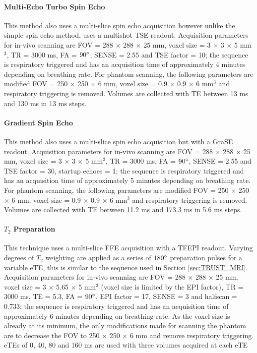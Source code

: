 \paragraph{Multi-Echo Turbo Spin Echo}

This method also uses a multi-slice spin echo acquisition however unlike the simple spin echo method, uses a multishot \ac{TSE} readout. Acquisition parameters for in-vivo scanning are \ac{FOV} = 288 $\times$ 288 $\times$ 25 mm, voxel size = 3 $\times$ 3 $\times$ 5 mm$^3$, \ac{TR} = 3000 ms, \ac{FA} = $90\degree$, \ac{SENSE} = 2.55 and \ac{TSE} factor = 10; the sequence is respiratory triggered and has an acquisition time of approximately 4 minutes depending on breathing rate. For phantom scanning, the following parameters are modified \ac{FOV} = 250 $\times$ 250 $\times$ 6 mm, voxel size = 0.9 $\times$ 0.9 $\times$ 6 mm$^3$ and respiratory triggering is removed. Volumes are collected with \ac{TE} between 13 ms and 130 ms in 13 ms steps.

\paragraph{Gradient Spin Echo}

This method also uses a multi-slice spin echo acquisition but with a \ac{GraSE} readout. Acquisition parameters for in-vivo scanning are \ac{FOV} = 288 $\times$ 288 $\times$ 25 mm, voxel size = 3 $\times$ 3 $\times$ 5 mm$^3$, \ac{TR} = 3000 ms, \ac{FA} = $90\degree$, \ac{SENSE} = 2.55 and \ac{TSE} factor = 30, startup echoes = 1; the sequence is respiratory triggered and has an acquisition time of approximately 5 minutes depending on breathing rate. For phantom scanning, the following parameters are modified \ac{FOV} = 250 $\times$ 250 $\times$ 6 mm, voxel size = 0.9 $\times$ 0.9 $\times$ 6 mm$^3$ and respiratory triggering is removed. Volumes are collected with \ac{TE} between 11.2 ms and 173.3 ms in 5.6 ms steps.

\paragraph{$T_2$ Preparation}

This technique uses a multi-slice \ac{FFE} acquisition with a \ac{TFEPI} readout. Varying degrees of $T_2$ weighting are applied as a series of $180\degree$ preparation pulses for a variable \ac{eTE}, this is similar to the sequence used in Section \ref{sec:TRUST_MRI}. Acquisition parameters for in-vivo scanning are \ac{FOV} = 288 $\times$ 288 $\times$ 25 mm, voxel size = 3 $\times$ 5.65 $\times$ 5 mm$^3$ (voxel size is limited by the \ac{EPI} factor), \ac{TR} = 3000 ms, \ac{TE} = 5.3, \ac{FA} = $90\degree$, \ac{EPI} factor = 17, \ac{SENSE} = 3 and halfscan = 0.733; the sequence is respiratory triggered and has an acquisition time of approximately 6 minutes depending on breathing rate. As the voxel size is already at its minimum, the only modifications made for scanning the phantom are to decrease the \ac{FOV} to 250 $\times$ 250 $\times$ 6 mm and remove respiratory triggering. \ac{eTE}s of 0, 40, 80 and 160 ms are used with three volumes acquired at each \ac{eTE}

